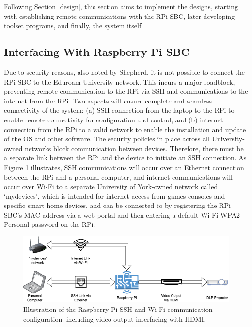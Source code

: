 Following Section \ref{design}, this section aims to implement the designs, starting with establishing remote communications with the RPi SBC, later developing toolset programs, and finally, the system itself.

\subsection{Interfacing With Raspberry Pi SBC}

Due to security reasons, also noted by Shepherd, it is not possible to connect the RPi SBC to the Eduroam University network. This incurs a major roadblock, preventing remote communication to the RPi via SSH and communications to the internet from the RPi. Two aspects will ensure complete and seamless connectivity of the system: (a) SSH connection from the laptop to the RPi to enable remote connectivity for configuration and control, and (b) internet connection from the RPi to a valid network to enable the installation and update of the OS and other software. The security policies in place across all University-owned networks block communication between devices. Therefore, there must be a separate link between the RPi and the device to initiate an SSH connection. As Figure \ref{fig:pi_interfacing} illustrates, SSH communications will occur over an Ethernet connection between the RPi and a personal computer, and internet communications will occur over Wi-Fi to a separate University of York-owned network called `mydevices', which is intended for internet access from games consoles and specific smart home devices, and can be connected to by registering the RPi SBC's MAC address via a web portal and then entering a default Wi-Fi WPA2 Personal password on the RPi.

\begin{figure}[H]
    \centering
    \includegraphics[width=1\textwidth]{assets/interface_diagram.png}
    \caption{Illustration of the Raspberry Pi SSH and Wi-Fi communication configuration, including video output interfacing with HDMI.}
    \label{fig:pi_interfacing}
\end{figure}

